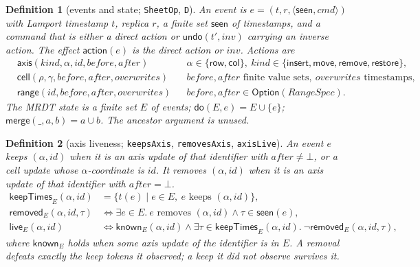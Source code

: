 \documentclass[11pt]{article}
\newtheorem{definition}{Definition}[section]
\newcommand{\lean}[1]{\texttt{\def\_{\textunderscore\allowbreak}#1}}
\newcommand{\seen}{\mathsf{seen}}
\newcommand{\merge}{\mathsf{merge}}
\newcommand{\live}{\mathsf{live}}
\newcommand{\Row}{\mathsf{row}}
\newcommand{\Col}{\mathsf{col}}
\begin{document}
\begin{definition}[events and state; \lean{SheetOp}, \lean{D}]
An event is $e=(t,r,\langle\seen,\mathit{cmd}\rangle)$ with Lamport
timestamp $t$, replica $r$, a finite set $\seen$ of timestamps, and a command
that is either a direct action or $\mathsf{undo}(t',\mathit{inv})$ carrying
an inverse action. The effect $\mathsf{action}(e)$ is the direct action or
$\mathit{inv}$. Actions are
\[
\begin{aligned}
&\mathsf{axis}(\mathit{kind},\alpha,\mathit{id},\mathit{before},\mathit{after})
 &&\alpha\in\{\Row,\Col\},\ \mathit{kind}\in\{\mathsf{insert},\mathsf{move},\mathsf{remove},\mathsf{restore}\},\\
&\mathsf{cell}(\rho,\gamma,\mathit{before},\mathit{after},\mathit{overwrites})
 &&\mathit{before},\mathit{after}\text{ finite value sets},\ \mathit{overwrites}\text{ timestamps},\\
&\mathsf{range}(\mathit{id},\mathit{before},\mathit{after},\mathit{overwrites})
 &&\mathit{before},\mathit{after}\in\mathsf{Option}(\mathit{RangeSpec}).
\end{aligned}
\]
The MRDT state is a finite set $E$ of events; $\mathsf{do}(E,e)=E\cup\{e\}$;
$\merge(\_,a,b)=a\cup b$. The ancestor argument is unused.
\end{definition}

\begin{definition}[axis liveness; \lean{keepsAxis}, \lean{removesAxis}, \lean{axisLive}]
An event $e$ \emph{keeps} $(\alpha,\mathit{id})$ when it is an axis update of
that identifier with $\mathit{after}\neq\bot$, or a cell update whose
$\alpha$-coordinate is $\mathit{id}$. It \emph{removes} $(\alpha,\mathit{id})$
when it is an axis update of that identifier with $\mathit{after}=\bot$.
\[
\begin{aligned}
\mathsf{keepTimes}_E(\alpha,\mathit{id})&=\{t(e)\mid e\in E,\ e\text{ keeps }(\alpha,\mathit{id})\},\\
\mathsf{removed}_E(\alpha,\mathit{id},\tau)&\Longleftrightarrow
 \exists e\in E.\ e\text{ removes }(\alpha,\mathit{id})\land\tau\in\seen(e),\\
\live_E(\alpha,\mathit{id})&\Longleftrightarrow
 \mathsf{known}_E(\alpha,\mathit{id})\land
 \exists\tau\in\mathsf{keepTimes}_E(\alpha,\mathit{id}).\ \neg\mathsf{removed}_E(\alpha,\mathit{id},\tau),
\end{aligned}
\]
where $\mathsf{known}_E$ holds when some axis update of the identifier is in
$E$. A removal defeats exactly the keep tokens it observed; a keep it did not
observe survives it.
\end{definition}
\end{document}
